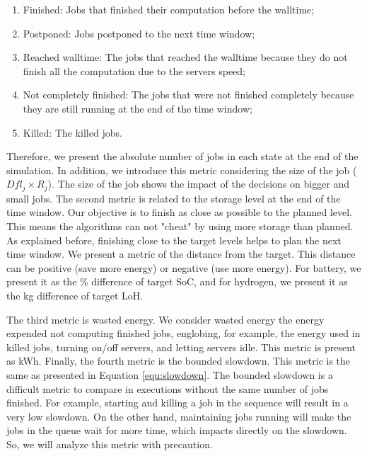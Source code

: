 \begin{enumerate}
    \item Finished: Jobs that finished their computation before the walltime;
    \item Postponed: Jobs postponed to the next time window;
    \item Reached walltime: The jobs that reached the walltime because they do not finish all the computation due to the servers speed;
    \item Not completely finished: The jobs that were not finished completely because they are still running at the end of the time window;
    \item Killed: The killed jobs.
\end{enumerate} 

Therefore, we present the absolute number of jobs in each state at the end of the simulation. In addition, we introduce this metric considering the size of the job ($Dfl_j \times R_j$). The size of the job shows the impact of the decisions on bigger and small jobs. The second metric is related to the storage level at the end of the time window. Our objective is to finish as close as possible to the planned level. This means the algorithms can not "cheat" by using more storage than planned. As explained before, finishing close to the target levels helps to plan the next time window. We present a metric of the distance from the target. This distance can be positive (save more energy) or negative (use more energy). For battery, we present it as the \% difference of target SoC, and for hydrogen, we present it as the kg difference of target LoH.

The third metric is wasted energy. We consider wasted energy the energy expended not computing finished jobs, englobing, for example, the energy used in killed jobs, turning on/off servers, and letting servers idle. This metric is present as kWh. Finally, the fourth metric is the bounded slowdown. This metric is the same as presented in Equation \ref{equ:slowdown}. The bounded slowdown is a difficult metric to compare in executions without the same number of jobs finished. For example, starting and killing a job in the sequence will result in a very low slowdown. On the other hand, maintaining jobs running will make the jobs in the queue wait for more time, which impacts directly on the slowdown. So, we will analyze this metric with precaution.


